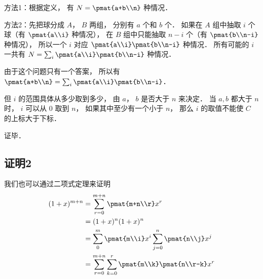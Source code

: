 方法1：根据定义， 有 $N = \pmat{a+b\\n}$ 种情况．

方法2：先把球分成 $A$，  $B$ 两组， 分别有 $a$ 个和 $b$ 个． 如果在 $A$ 组中抽取 $i$ 个球（有 $\pmat{a\\i}$ 种情况）， 在 $B$ 组中只能抽取  $n - i$ 个（有 $\pmat{b\\n-i}$ 种情况）， 所以一个 $i$ 对应 $\pmat{a\\i} \pmat{b\\n-i}$ 种情况． 所有可能的 $i$ 一共有 $N = \sum_i \pmat{a\\i} \pmat{b\\n-i}$ 种情况．

由于这个问题只有一个答案， 所以有 $\pmat{a+b\\n} = \sum_i \pmat{a\\i} \pmat{b\\n-i}$． 

但 $i$ 的范围具体从多少取到多少， 由 $a$，  $b$ 是否大于 $n$ 来决定． 当 $a,b$ 都大于 $n$ 时， $i$ 可以从 0 取到 $n$，  如果其中至少有一个小于 $n$，  那么 $i$ 的取值不能使 $C$ 的上标大于下标．

证毕．

\subsection{证明2}
我们也可以通过二项式定理来证明
\begin{equation}
\begin{aligned}
(1 + x)^{m+n} &= \sum_{r=0}^{m+n} \pmat{m+n\\r}x^r\\
&=(1+x)^n (1+x)^n\\
&=\sum_0^m \pmat{m\\i}x^i  \sum_{j=0}^n \pmat{n\\j} x^j\\
&=\sum_{r=0}^{m+n} \sum_{k=0}^r \pmat{m\\k} \pmat{n\\r-k} x^r
\end{aligned}
\end{equation}
